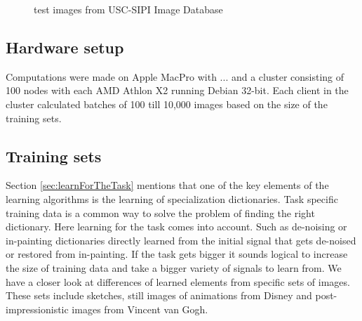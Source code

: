 \begin{figure}[h]
\hspace{5mm}
\hspace{5mm}
\caption{test images from USC-SIPI Image Database}
\label{fig:USC-SIPI}
\end{figure}

\subsection{Hardware setup} 
Computations were made on Apple MacPro with ... 
and a cluster consisting of 100 nodes with each AMD Athlon X2  running Debian 32-bit. Each client in the cluster calculated batches of
100 till 10,000 images based on the size of the training sets.

\subsection{Training sets}
Section \ref{sec:learnForTheTask} mentions that one of the key
elements of the learning algorithms is the learning of specialization
dictionaries. Task specific training data is a common way to solve the problem
of finding  the right dictionary. Here learning for the task comes into
account. Such as de-noising or in-painting dictionaries directly learned from
the initial signal that gets de-noised or restored from in-painting. If the task
gets bigger it sounds logical to increase the size of training data and take a
bigger variety of signals to learn from.  We have a closer look at differences
of learned elements from specific sets of images. These sets include sketches,
still images of animations from Disney and post-impressionistic images from
Vincent van Gogh.  

